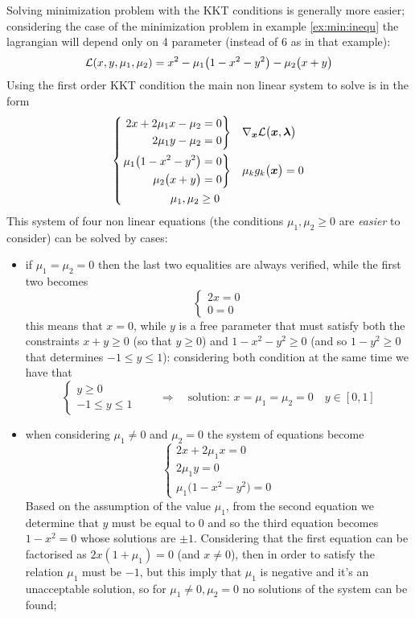 	\begin{example}{}
		Solving minimization problem with the KKT conditions is generally more easier; considering the case of the minimization problem in example \ref{ex:min:inequ} the lagrangian will depend only on 4 parameter (instead of 6 as in that example):
		\[ \mathcal L(x,y,\mu_1,\mu_2) = x^2 - \mu_1\big(1-x^2-y^2\big) - \mu_2\big(x+y\big) \]
		Using the first order KKT condition the main non linear system to solve is in the form
		\[\left\{\begin{aligned}
			\left. \begin{aligned}				
				2x +2\mu_1x - \mu_2 &= 0 \\
				2 \mu_1 y - \mu_2 &= 0
			\end{aligned} \right\} & \quad \nabla_{\boldsymbol{x}} \mathcal L\big(\boldsymbol{x}, \boldsymbol{\lambda}\big)  	\\		
			\left. \begin{aligned}
				\mu_1\big(1-x^2-y^2\big) & = 0 \\
				\mu_2 \big(x+y\big) & = 0
			\end{aligned} \right\} &  \quad \mu_k g_k\big(\boldsymbol{x} \big) = 0\\
			\mu_1,\mu_2 \geq 0 \quad & 
		\end{aligned} \right.\]
		This system of four non linear equations (the conditions $\mu_1,\mu_2\geq0$ are \textit{easier} to consider) can be solved by cases:
		\begin{itemize}
			\item if $\mu_1 = \mu_2 = 0$ then the last two equalities are always verified, while the first two becomes
			\[\begin{cases}
				2x = 0 \\
				0 = 0 
			\end{cases}\]
			this means that $x = 0$, while $y$ is a free parameter that must satisfy both the constraints $x+y\geq 0 $ (so that $y \geq 0$) and $1-x^2-y^2 \geq 0 $ (and so $1-y^2 \geq 0 $ that determines $-1 \leq y \leq 1$): considering both condition at the same time we have that
			\[ \begin{cases}
				y \geq 0 \\ -1 \leq y \leq 1 
			\end{cases} \qquad \Rightarrow \quad \textrm{solution: } x = \mu_1 = \mu_2 = 0 \quad y \in [0,1]\]
			
			\item when considering $\mu_1 \neq 0$ and $\mu_2 = 0$ the system of equations become
			\[\begin{cases}
				2x + 2 \mu_1x = 0 \\
				2\mu_1 y = 0 \\
				\mu_1\big(1-x^2-y^2\big) = 0
			\end{cases}\]
			Based on the assumption of the value $\mu_1$, from the second equation we determine that $y$ must be equal to $0$ and so the third equation becomes $1-x^2 = 0$ whose solutions are $\pm 1$. Considering that the first equation can be factorised as $2x(1+\mu_1) = 0$ (and $x\neq 0$), then in order to satisfy the relation $\mu_1$ must be $-1$, but this imply that $\mu_1$ is negative and it's an unacceptable solution, so for $\mu_1 \neq 0,\mu_2=0$ no solutions of the system can be found;
			

\end{itemize}
\end{example}
